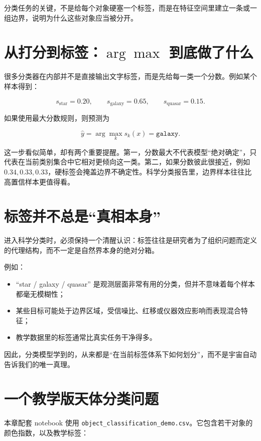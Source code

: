 \begin{defbox}[分类的核心]
分类任务的关键，不是给每个对象硬塞一个标签，而是在特征空间里建立一条或一组边界，说明为什么这些对象应当被分开。
\end{defbox}

\section{从打分到标签：\texorpdfstring{\(\arg\max\)}{argmax} 到底做了什么}

很多分类器在内部并不是直接输出文字标签，而是先给每一类一个分数。例如某个样本得到：

\[
s_{\mathrm{star}}=0.20,\qquad
s_{\mathrm{galaxy}}=0.65,\qquad
s_{\mathrm{quasar}}=0.15.
\]

如果使用最大分数规则，则预测为

\[
\hat{y}=\arg\max_k s_k(x)=\texttt{galaxy}.
\]

这一步看似简单，却有两个重要提醒。第一，分数最大不代表模型“绝对确定”，只代表在当前类别集合中它相对更倾向这一类。第二，如果分数彼此很接近，例如 $0.34,0.33,0.33$，硬标签会掩盖边界不确定性。科学分类报告里，边界样本往往比高置信样本更值得看。

\section{标签并不总是“真相本身”}

进入科学分类时，必须保持一个清醒认识：标签往往是研究者为了组织问题而定义的代理结构，而不一定是自然界本身的绝对分箱。

例如：

\begin{itemize}
    \item “star / galaxy / quasar” 是观测层面非常有用的分类，但并不意味着每个样本都毫无模糊性；
    \item 某些目标可能处于边界区域，受信噪比、红移或仪器效应影响而表现混合特征；
    \item 教学数据里的标签通常比真实任务干净得多。
\end{itemize}

因此，分类模型学到的，从来都是“在当前标签体系下如何划分”，而不是宇宙自动告诉我们的唯一真理。

\section{一个教学版天体分类问题}

本章配套 notebook 使用 \nolinkurl{object_classification_demo.csv}。它包含若干对象的颜色指数，以及教学标签：

